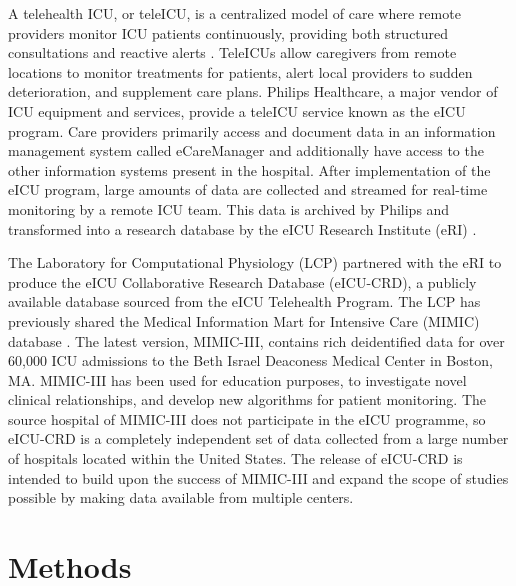 \documentclass[english]{article}
\begin{document}
A telehealth ICU, or teleICU, is a centralized model of care where remote providers monitor ICU patients continuously, providing both structured consultations and reactive alerts \cite{lilly2014multicenter}. TeleICUs allow caregivers from remote locations to monitor treatments for patients, alert local providers to sudden deterioration, and supplement care plans.
Philips Healthcare, a major vendor of ICU equipment and services, provide a teleICU service known as the eICU program.
Care providers primarily access and document data in an information management system called eCareManager and additionally have access to the other information systems present in the hospital.
After implementation of the eICU program, large amounts of data are collected and streamed for real-time monitoring by a remote ICU team.
This data is archived by Philips and transformed into a research database by the eICU Research Institute (eRI) \cite{mcshea2010eicu}.


The Laboratory for Computational Physiology (LCP) partnered with the eRI to produce the eICU Collaborative Research Database (eICU-CRD), a publicly available database sourced from the eICU Telehealth Program.
The LCP has previously shared the Medical Information Mart for Intensive Care (MIMIC) database \cite{MIMIC2011, MIMIC2016}. The latest version, MIMIC-III, contains rich deidentified data for over 60,000 ICU admissions to the Beth Israel Deaconess Medical Center in Boston, MA. MIMIC-III has been used for education purposes, to investigate novel clinical relationships, and develop new algorithms for patient monitoring. The source hospital of MIMIC-III does not participate in the eICU programme, so eICU-CRD is a completely independent set of data collected from a large number of hospitals located within the United States. The release of eICU-CRD is intended to build upon the success of MIMIC-III and expand the scope of studies possible by making data available from multiple centers.

\section*{Methods}
\end{document}
